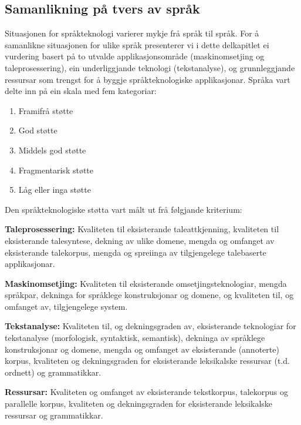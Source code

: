 \begin{multicols}{2}
\subsection{Samanlikning på tvers av språk}

Situasjonen for språkteknologi varierer mykje frå språk til språk. For å samanlikne situasjonen for ulike språk presenterer vi i dette delkapitlet ei vurdering basert på to utvalde applikasjonsområde (maskinomsetjing og taleprosessering), ein underliggjande teknologi (tekstanalyse), og grunnleggjande ressursar som trengst for å byggje språkteknologiske applikasjonar. Språka vart delte inn på ein skala med fem kategoriar:

\begin{enumerate}
\item Framifrå støtte
\item God støtte
\item Middels god støtte 
\item Fragmentarisk støtte
\item Låg eller inga støtte
\end{enumerate}

Den språkteknologiske støtta vart målt ut frå følgjande kriterium:

\textbf{Taleprosessering:} Kvaliteten til eksisterande taleattkjenning, kvaliteten til eksisterande talesyntese, dekning av ulike domene, mengda og omfanget av eksisterande talekorpus, mengda og spreiinga av tilgjengelege talebaserte applikasjonar.

\textbf{Maskinomsetjing:} Kvaliteten til eksisterande omsetjingsteknologiar, mengda språkpar, dekninga for språklege konstruksjonar og domene, og kvaliteten til, og omfanget av, tilgjengelege system.

\textbf{Tekstanalyse:} Kvaliteten til, og dekningsgraden av, eksisterande teknologiar for tekstanalyse (morfologisk, syntaktisk, semantisk), dekninga av språklege konstruksjonar og domene, mengda og omfanget av eksisterande (annoterte) korpus, kvaliteten og dekningsgraden for eksisterande leksikalske ressursar (t.d. ordnett) og grammatikkar.

\textbf{Ressursar:} Kvaliteten og omfanget av eksisterande tekstkorpus, talekorpus og parallelle korpus, kvaliteten og dekningsgraden for eksisterande leksikalske ressursar og grammatikkar.



\end{multicols}
